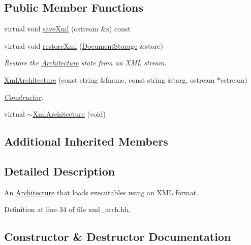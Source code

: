 \subsection*{Public Member Functions}
\begin{DoxyCompactItemize}
\item 
virtual void \mbox{\hyperlink{class_xml_architecture_abf5dd16b5343f89d2b165cf2206c7bf6}{save\+Xml}} (ostream \&s) const
\item 
virtual void \mbox{\hyperlink{class_xml_architecture_aead4d5224e18ab98cd30ca89774b9faa}{restore\+Xml}} (\mbox{\hyperlink{class_document_storage}{Document\+Storage}} \&store)
\begin{DoxyCompactList}\small\item\em Restore the \mbox{\hyperlink{class_architecture}{Architecture}} state from an X\+ML stream. \end{DoxyCompactList}\item 
\mbox{\hyperlink{class_xml_architecture_a1a6185aa79d3d4e6be5e10d1fb9db8ba}{Xml\+Architecture}} (const string \&fname, const string \&targ, ostream $\ast$estream)
\begin{DoxyCompactList}\small\item\em \mbox{\hyperlink{class_constructor}{Constructor}}. \end{DoxyCompactList}\item 
virtual \mbox{\hyperlink{class_xml_architecture_a2e9b7847037cb3739e84537b82a62d1e}{$\sim$\+Xml\+Architecture}} (void)
\end{DoxyCompactItemize}
\subsection*{Additional Inherited Members}


\subsection{Detailed Description}
An \mbox{\hyperlink{class_architecture}{Architecture}} that loads executables using an X\+ML format. 

Definition at line 34 of file xml\+\_\+arch.\+hh.



\subsection{Constructor \& Destructor Documentation}
\mbox{\label{class_xml_architecture_a1a6185aa79d3d4e6be5e10d1fb9db8ba}} 
